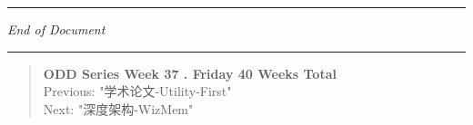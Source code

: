 \documentclass[
]{article}
\begin{document}
\begin{center}\rule{0.5\linewidth}{0.5pt}\end{center}

\emph{End of Document}

\begin{center}\rule{0.5\linewidth}{0.5pt}\end{center}

\begin{quote}
\textbf{ODD Series \textbar{} Week 37 . Friday \textbar{} 40 Weeks
Total}\\
Previous: "学术论文-Utility-First"\\
Next: "深度架构-WizMem"
\end{quote}
\end{document}
